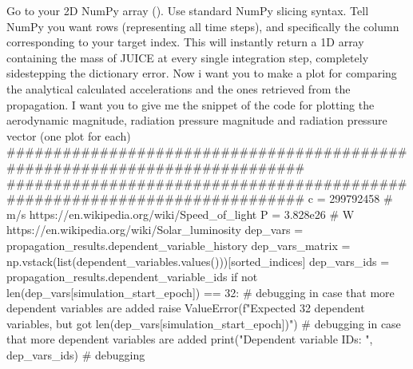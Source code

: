 Go to your 2D NumPy array ().\markdownRendererOlItemEnd 
{}Use standard NumPy slicing syntax. Tell NumPy you want  rows (representing all time steps), and specifically the column corresponding to your target index.\markdownRendererOlItemEnd 
\markdownRendererOlEnd \markdownRendererInterblockSeparator
{}This will instantly return a 1D array containing the mass of JUICE at every single integration step, completely sidestepping the dictionary error.\markdownRendererInterblockSeparator
{}\markdownRendererThematicBreak{}\markdownRendererInterblockSeparator
{}
\markdownRendererSectionEnd 
\markdownRendererSectionEnd \markdownRendererSectionBegin
{}\markdownRendererInterblockSeparator
{}Now i want you to make a plot for comparing the analytical calculated accelerations and the ones retrieved from the propagation. I want you to give me the snippet of the code for plotting the aerodynamic magnitude, radiation pressure magnitude and radiation pressure vector (one plot for each)\markdownRendererInterblockSeparator
{}###########################################################################\markdownRendererInterblockSeparator
{}
\markdownRendererSectionEnd 
\markdownRendererSectionEnd \markdownRendererSectionBegin
{}\markdownRendererInterblockSeparator
{}########################################################################### c = 299792458 # m/s https://en.wikipedia.org/wiki/Speed_of_light P = 3.828e26 # W https://en.wikipedia.org/wiki/Solar_luminosity\markdownRendererInterblockSeparator
{}
\markdownRendererSectionEnd \markdownRendererSectionBegin
{}\markdownRendererInterblockSeparator
{}dep_vars = propagation_results.dependent_variable_history dep_vars_matrix = np.vstack(list(dependent_variables.values()))[sorted_indices] dep_vars_ids = propagation_results.dependent_variable_ids if not len(dep_vars[simulation_start_epoch]) == 32: # debugging in case that more dependent variables are added raise ValueError(f"Expected 32 dependent variables, but got {len(dep_vars[simulation_start_epoch])}") # debugging in case that more dependent variables are added print("Dependent variable IDs: ", dep_vars_ids) # debugging\markdownRendererInterblockSeparator
{}
\markdownRendererSectionEnd \markdownRendererSectionBegin
{}\markdownRendererInterblockSeparator
